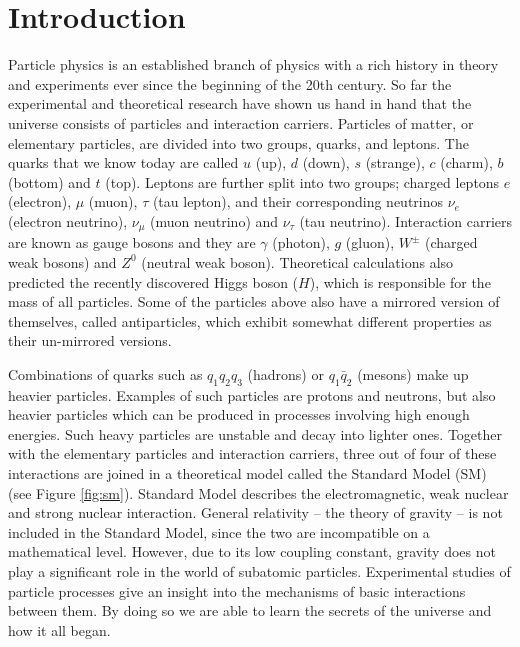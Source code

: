\pagestyle{plain}
\chapter{Introduction}
Particle physics is an established branch of physics with a rich history in theory and experiments ever since the beginning of the 20th century. So far the experimental and theoretical research have shown us hand in hand that the universe consists of particles and interaction carriers. Particles of matter, or elementary particles, are divided into two groups, quarks, and leptons. The quarks that we know today are called $u$ (up), $d$ (down), $s$ (strange), $c$ (charm), $b$ (bottom) and $t$ (top). Leptons are  further split into two groups; charged leptons $e$ (electron), $\mu$ (muon), $\tau$ (tau lepton), and their corresponding neutrinos $\nu_e$ (electron neutrino), $\nu_\mu$ (muon neutrino) and $\nu_\tau$ (tau neutrino). Interaction carriers are known as gauge bosons and they are $\gamma$ (photon), $g$ (gluon), $W^\pm$ (charged weak bosons) and $Z^0$ (neutral weak boson). Theoretical calculations also predicted the recently discovered Higgs boson ($H$), which is responsible for the mass of all particles. Some of the particles above also have a mirrored version of themselves, called antiparticles, which exhibit somewhat different properties as their un-mirrored versions.

Combinations of quarks such as $q_1 q_2 q_3$ (hadrons) or $q_1 \bar{q}_2$ (mesons) make up heavier particles. Examples of such particles are protons and neutrons, but also heavier particles which can be produced in processes involving high enough energies. Such heavy particles are unstable and decay into lighter ones. Together with the elementary particles and interaction carriers, three out of four of these interactions are joined in a theoretical model called the Standard Model (SM) \cite{GLASHOW1961579, PhysRevLett.19.1264, salam1994weak, GIMmech} (see Figure \ref{fig:sm}). Standard Model describes the electromagnetic, weak nuclear and strong nuclear interaction. General relativity -- the theory of gravity -- is not included in the Standard Model, since the two are incompatible on a mathematical level. However, due to its low coupling constant, gravity does not play a significant role in the world of subatomic particles. Experimental studies of particle processes give an insight into the mechanisms of basic interactions between them. By doing so we are able to learn the secrets of the universe and how it all began.


